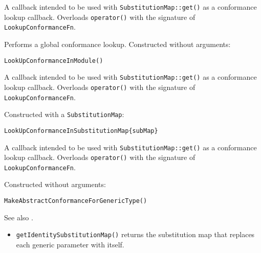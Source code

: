 \documentclass[../generics]{subfiles}
\begin{document}
A callback intended to be used with \texttt{SubstitutionMap::get()} as a conformance lookup callback. Overloads \texttt{operator()} with the signature of \texttt{LookupConformanceFn}.

Performs a global conformance lookup. Constructed without arguments:
\begin{Verbatim}
LookUpConformanceInModule()
\end{Verbatim}

A callback intended to be used with \texttt{SubstitutionMap::get()} as a conformance lookup callback. Overloads \texttt{operator()} with the signature of \texttt{LookupConformanceFn}.

Constructed with a \texttt{SubstitutionMap}:
\begin{Verbatim}
LookUpConformanceInSubstitutionMap{subMap}
\end{Verbatim}

A callback intended to be used with \texttt{SubstitutionMap::get()} as a conformance lookup callback. Overloads \texttt{operator()} with the signature of \texttt{LookupConformanceFn}.

Constructed without arguments:
\begin{Verbatim}
MakeAbstractConformanceForGenericType()
\end{Verbatim}

See also .

\begin{itemize}
\item \texttt{getIdentitySubstitutionMap()} returns the substitution map that replaces each generic parameter with itself.
\end{itemize}
\end{document}

